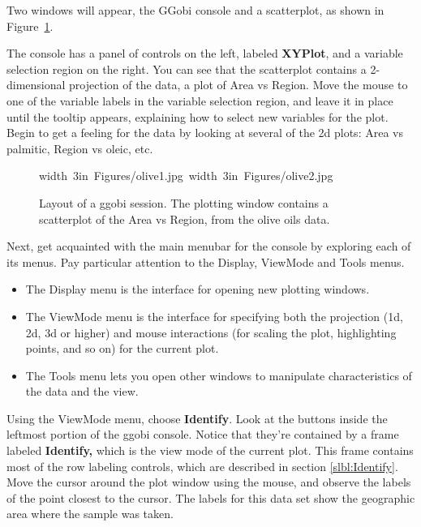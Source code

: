 \documentclass[11pt]{article}
\begin{document}
Two windows will appear, the GGobi console
and a scatterplot, as shown in Figure~\ref{fig1}.

The console has a panel of controls on the left, labeled {\bf
XYPlot}, and a variable selection region on the right.  You can see
that the scatterplot contains a 2-dimensional projection of the data,
a plot of Area vs Region.  Move the mouse to one of the variable labels
in the variable selection region, and leave it in place until the
tooltip appears, explaining how to select new variables for the
plot.   Begin to get a feeling for the data by looking at several of
the 2d plots:  Area vs palmitic, Region vs oleic, etc.

\begin{figure}[h]
\hbox{\pdfimage width 3in {Figures/olive1.jpg}
      \pdfimage width 3in {Figures/olive2.jpg}
}
\caption{Layout of a ggobi session.  The plotting window contains a
scatterplot of the Area vs Region, from the olive oils data.
}%
\label{fig1}
\end{figure}

Next, get acquainted with the main menubar for the console by
exploring each of its menus.  Pay particular attention to the
Display, ViewMode and Tools menus.

\begin {itemize}
\item The Display menu is the interface for opening new plotting
  windows.
\item The ViewMode menu is the interface for specifying both the
  projection (1d, 2d, 3d or higher) and mouse interactions (for scaling
  the plot, highlighting points, and so on) for the current plot.
\item The Tools menu lets you open other windows to manipulate
  characteristics of the data and the view.
\end {itemize}

Using the ViewMode menu, choose {\bf Identify}. Look at the buttons
inside the leftmost portion of the ggobi console. Notice that they're
contained by a frame labeled {\bf Identify,} which is the view mode
of the current plot.  This frame contains most of the row labeling
controls, which are described in section \ref{slbl:Identify}. Move the
cursor around the plot window using the mouse, and observe the labels
of the point closest to the cursor.  The labels for this data set show
the geographic area where the sample was taken.
\end{document}
